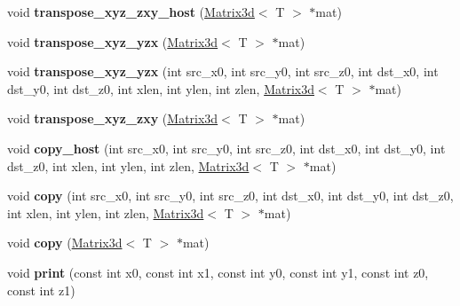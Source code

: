 \begin{DoxyCompactItemize}
\item 
\hypertarget{classMatrix3d_a7eed3fb23f46d42623194e8536d06901}{}\label{classMatrix3d_a7eed3fb23f46d42623194e8536d06901} 
void {\bfseries transpose\+\_\+xyz\+\_\+zxy\+\_\+host} (\hyperlink{classMatrix3d}{Matrix3d}$<$ T $>$ $\ast$mat)
\item 
\hypertarget{classMatrix3d_a970f62c82ece58f5dffcfd16c0c3b6c8}{}\label{classMatrix3d_a970f62c82ece58f5dffcfd16c0c3b6c8} 
void {\bfseries transpose\+\_\+xyz\+\_\+yzx} (\hyperlink{classMatrix3d}{Matrix3d}$<$ T $>$ $\ast$mat)
\item 
\hypertarget{classMatrix3d_ab286179acccc643054d36b67a88aac0a}{}\label{classMatrix3d_ab286179acccc643054d36b67a88aac0a} 
void {\bfseries transpose\+\_\+xyz\+\_\+yzx} (int src\+\_\+x0, int src\+\_\+y0, int src\+\_\+z0, int dst\+\_\+x0, int dst\+\_\+y0, int dst\+\_\+z0, int xlen, int ylen, int zlen, \hyperlink{classMatrix3d}{Matrix3d}$<$ T $>$ $\ast$mat)
\item 
\hypertarget{classMatrix3d_aa89eeeee9451a7fdfa965e7c0a80393e}{}\label{classMatrix3d_aa89eeeee9451a7fdfa965e7c0a80393e} 
void {\bfseries transpose\+\_\+xyz\+\_\+zxy} (\hyperlink{classMatrix3d}{Matrix3d}$<$ T $>$ $\ast$mat)
\item 
\hypertarget{classMatrix3d_a4c0dca7e94a6c276a902523530053d73}{}\label{classMatrix3d_a4c0dca7e94a6c276a902523530053d73} 
void {\bfseries copy\+\_\+host} (int src\+\_\+x0, int src\+\_\+y0, int src\+\_\+z0, int dst\+\_\+x0, int dst\+\_\+y0, int dst\+\_\+z0, int xlen, int ylen, int zlen, \hyperlink{classMatrix3d}{Matrix3d}$<$ T $>$ $\ast$mat)
\item 
\hypertarget{classMatrix3d_a0e186f5e20711362c3f755831d8b73d7}{}\label{classMatrix3d_a0e186f5e20711362c3f755831d8b73d7} 
void {\bfseries copy} (int src\+\_\+x0, int src\+\_\+y0, int src\+\_\+z0, int dst\+\_\+x0, int dst\+\_\+y0, int dst\+\_\+z0, int xlen, int ylen, int zlen, \hyperlink{classMatrix3d}{Matrix3d}$<$ T $>$ $\ast$mat)
\item 
\hypertarget{classMatrix3d_adb5e54dc56bddd5cf6deebda85157516}{}\label{classMatrix3d_adb5e54dc56bddd5cf6deebda85157516} 
void {\bfseries copy} (\hyperlink{classMatrix3d}{Matrix3d}$<$ T $>$ $\ast$mat)
\item 
\hypertarget{classMatrix3d_a87fd2fcb250d8e3b1bbbd0768b9331a5}{}\label{classMatrix3d_a87fd2fcb250d8e3b1bbbd0768b9331a5} 
void {\bfseries print} (const int x0, const int x1, const int y0, const int y1, const int z0, const int z1)
\item 
\hypertarget{classMatrix3d_aea3e3b6e9d02625a4a76a71c3bb677bc}{}\label{classMatrix3d_aea3e3b6e9d02625a4a76a71c3bb677bc} 

\end{DoxyCompactItemize}
